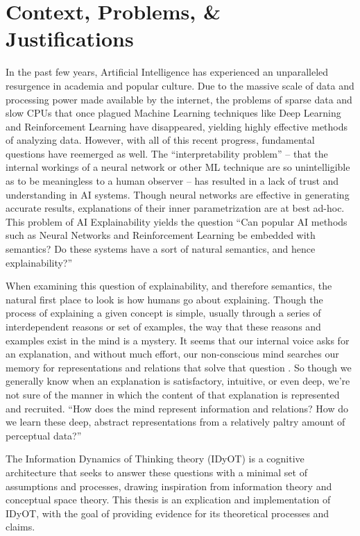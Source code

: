 \section{Context, Problems, \& Justifications}
\label{section:context-problems-justifications}

In the past few years, Artificial Intelligence has experienced an unparalleled resurgence in academia and popular culture. Due to the massive scale of data and processing power made available by the internet, the problems of sparse data and slow CPUs that once plagued Machine Learning techniques like Deep Learning \citep{lecun2015deep} and Reinforcement Learning \citep{sutton1998introduction} have disappeared, yielding highly effective methods of analyzing data. However, with all of this recent progress, fundamental questions have reemerged as well. The “interpretability problem” \citep{chalmers1996conscious} – that the internal workings of a neural network or other ML technique are so unintelligible as to be meaningless to a human observer – has resulted in a lack of trust and understanding in AI systems. Though neural networks are effective in generating accurate results, explanations of their inner parametrization are at best ad-hoc. This problem of AI Explainability yields the question “Can popular AI methods such as Neural Networks and Reinforcement Learning be embedded with semantics? Do these systems have a sort of natural semantics, and hence explainability?”

When examining this question of explainability, and therefore semantics, the natural first place to look is how humans go about explaining. Though the process of explaining a given concept is simple, usually through a series of interdependent reasons or set of examples, the way that these reasons and examples exist in the mind is a mystery. It seems that our internal voice asks for an explanation, and without much effort, our non-conscious mind searches our memory for
representations and relations that solve that question \citep{baars1993cognitive}. So though we generally know when an explanation is satisfactory, intuitive, or even deep, we’re not sure of the manner in which the content of that explanation is represented and recruited. “How does the mind represent information and relations? How do we learn these deep, abstract representations from a relatively paltry amount of perceptual data?” \citep{quine1969ontological}

The Information Dynamics of Thinking theory (IDyOT) \citep{wiggins2018creativity} is a cognitive architecture that seeks to answer these questions with a minimal set of assumptions and processes, drawing inspiration from information theory and conceptual space theory.  This thesis is an explication and implementation of IDyOT, with the goal of providing evidence for its theoretical processes and claims.
